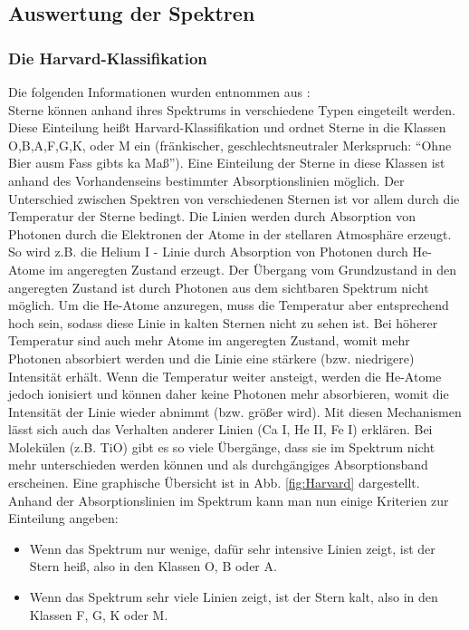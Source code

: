\subsection{Auswertung der Spektren}
\subsubsection{Die Harvard-Klassifikation}
Die folgenden Informationen wurden entnommen aus \cite{ttunen}:\\
Sterne können anhand ihres Spektrums in verschiedene Typen eingeteilt werden. Diese Einteilung heißt Harvard-Klassifikation und ordnet Sterne in die Klassen O,B,A,F,G,K, oder M ein (fränkischer, geschlechtsneutraler Merkspruch: \enquote{Ohne Bier ausm Fass gibts ka Maß}). Eine Einteilung der Sterne in diese Klassen ist anhand des Vorhandenseins bestimmter Absorptionslinien möglich. Der Unterschied zwischen Spektren von verschiedenen Sternen ist vor allem durch die Temperatur der Sterne bedingt. Die Linien werden durch Absorption von Photonen durch die Elektronen der Atome in der stellaren Atmosphäre erzeugt. So wird z.B. die Helium I - Linie durch Absorption von Photonen durch He-Atome im angeregten Zustand erzeugt. Der Übergang vom Grundzustand in den angeregten Zustand ist durch Photonen aus dem sichtbaren Spektrum nicht möglich. Um die He-Atome anzuregen, muss die Temperatur aber entsprechend hoch sein, sodass diese Linie in kalten Sternen nicht zu sehen ist. Bei höherer Temperatur sind auch mehr Atome im angeregten Zustand, womit mehr Photonen absorbiert werden und die Linie eine stärkere (bzw. niedrigere) Intensität erhält. Wenn die Temperatur weiter ansteigt, werden die He-Atome jedoch ionisiert und können daher keine Photonen mehr absorbieren, womit die Intensität der Linie wieder abnimmt (bzw. größer wird). Mit diesen Mechanismen lässt sich auch das Verhalten anderer Linien (Ca I, He II, Fe I) erklären. Bei Molekülen (z.B. TiO) gibt es so viele Übergänge, dass sie im Spektrum nicht mehr unterschieden werden können und als durchgängiges Absorptionsband erscheinen. Eine graphische Übersicht ist in Abb. \ref{fig:Harvard} dargestellt.
\\
Anhand der Absorptionslinien im Spektrum kann man nun einige Kriterien zur Einteilung angeben:
\begin{itemize}
\item Wenn das Spektrum nur wenige, dafür sehr intensive Linien zeigt, ist der Stern heiß, also in den Klassen O, B oder A.
\item Wenn das Spektrum sehr viele Linien zeigt, ist der Stern kalt, also in den Klassen F, G, K oder M.
\end{itemize}

